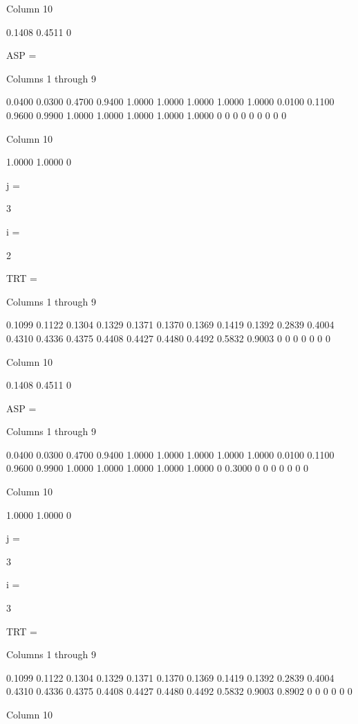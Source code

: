   Column 10

    0.1408
    0.4511
         0


ASP =

  Columns 1 through 9

    0.0400    0.0300    0.4700    0.9400    1.0000    1.0000    1.0000    1.0000    1.0000
    0.0100    0.1100    0.9600    0.9900    1.0000    1.0000    1.0000    1.0000    1.0000
         0         0         0         0         0         0         0         0         0

  Column 10

    1.0000
    1.0000
         0


j =

     3


i =

     2


TRT =

  Columns 1 through 9

    0.1099    0.1122    0.1304    0.1329    0.1371    0.1370    0.1369    0.1419    0.1392
    0.2839    0.4004    0.4310    0.4336    0.4375    0.4408    0.4427    0.4480    0.4492
    0.5832    0.9003         0         0         0         0         0         0         0

  Column 10

    0.1408
    0.4511
         0


ASP =

  Columns 1 through 9

    0.0400    0.0300    0.4700    0.9400    1.0000    1.0000    1.0000    1.0000    1.0000
    0.0100    0.1100    0.9600    0.9900    1.0000    1.0000    1.0000    1.0000    1.0000
         0    0.3000         0         0         0         0         0         0         0

  Column 10

    1.0000
    1.0000
         0


j =

     3


i =

     3


TRT =

  Columns 1 through 9

    0.1099    0.1122    0.1304    0.1329    0.1371    0.1370    0.1369    0.1419    0.1392
    0.2839    0.4004    0.4310    0.4336    0.4375    0.4408    0.4427    0.4480    0.4492
    0.5832    0.9003    0.8902         0         0         0         0         0         0

  Column 10

